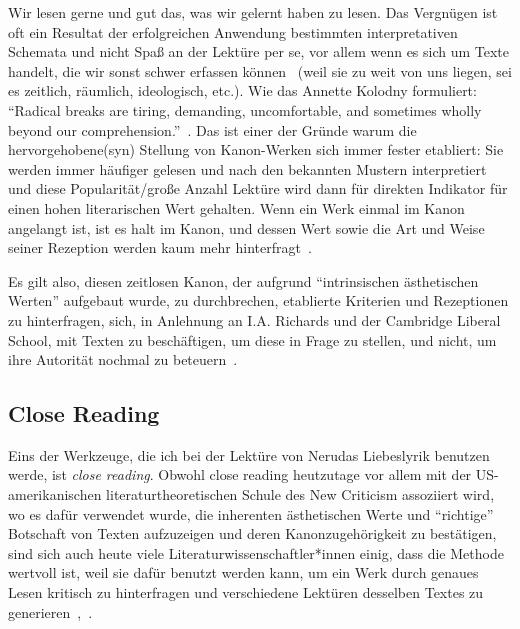 Wir lesen gerne und gut das, was wir gelernt haben zu lesen.
Das Vergnügen ist oft ein Resultat der erfolgreichen Anwendung bestimmten interpretativen Schemata und nicht Spaß an der Lektüre per se, vor allem wenn es sich um Texte handelt, die wir sonst schwer erfassen können~\cite{Kolodny1980} (weil sie zu weit von uns liegen, sei es zeitlich, räumlich, ideologisch, etc.).
Wie das Annette Kolodny formuliert:
``Radical breaks are tiring, demanding, uncomfortable, and sometimes wholly beyond our comprehension.''~\cite{Kolodny1980}.
Das ist einer der Gründe warum die hervorgehobene(syn) Stellung von Kanon-Werken sich immer fester etabliert:
Sie werden immer häufiger gelesen und nach den bekannten Mustern interpretiert und diese Popularität/große Anzahl Lektüre wird dann für direkten Indikator für einen hohen literarischen Wert gehalten.
Wenn ein Werk einmal im Kanon angelangt ist, ist es halt im Kanon, und dessen Wert sowie die Art und Weise seiner Rezeption werden kaum mehr hinterfragt~\cite{Kolodny1980}.

Es gilt also, diesen zeitlosen Kanon, der aufgrund ``intrinsischen ästhetischen Werten'' aufgebaut wurde, zu durchbrechen, etablierte Kriterien und Rezeptionen zu hinterfragen, %
sich, in Anlehnung an I.A. Richards und der Cambridge Liberal School, mit Texten zu beschäftigen, um diese in Frage zu stellen, und nicht, um ihre Autorität nochmal zu beteuern~\cite{North2013}.

\begin{comment}
Worüber geschrieben wird und welche Schrifte überliefert werden, prägt auch welche Themen als wichtig angesehen werden.
Was wiederum maßgeblich durch vorherrschende Machtverhältnisse geprägt wird.
\end{comment}


\subsection{Close Reading}

Eins der Werkzeuge, die ich bei der Lektüre von Nerudas Liebeslyrik benutzen werde, ist \textit{close reading}.
Obwohl close reading heutzutage vor allem mit der US-amerikanischen literaturtheoretischen Schule des New Criticism assoziiert wird, wo es dafür verwendet wurde, die inherenten ästhetischen Werte und ``richtige'' Botschaft von Texten aufzuzeigen und deren Kanonzugehörigkeit zu bestätigen, sind sich auch heute viele Literaturwissenschaftler*innen einig, dass die Methode wertvoll ist, weil sie dafür benutzt werden kann, um ein Werk durch genaues Lesen kritisch zu hinterfragen und verschiedene Lektüren desselben Textes zu generieren~\cite{Gallop2007},~\cite{Beehler1988}.


